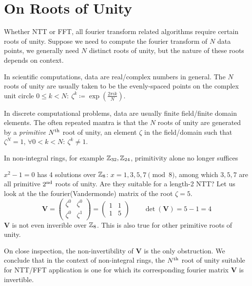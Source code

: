 \section{On Roots of Unity} \label{section:roots}
Whether NTT or FFT, all fourier transform related algorithms require certain roots of unity. Suppose we need to compute the fourier transform of \(N\) data points, we generally need \(N\) distinct roots of unity, but the nature of these roots depends on context.

In scientific computations, data are real/complex numbers in general. The \(N\) roots of unity are usually taken to be the evenly-spaced points on the complex unit circle \(0 \le k < N:\: \zeta^k \coloneq \exp{(\frac{2 \pi i k}{N})}\).

In discrete computational problems, data are usually finite field/finite domain elements. The often repeated mantra is that the \(N\) roots of unity are generated by a \emph{primitive} \(N\textsuperscript{th}\) root of unity, an element \(\zeta\) in the field/domain such that \(\zeta^N = 1\), \(\forall 0 < k < N:\: \zeta^k \neq 1\).

In non-integral rings, for example \(\mathbb{Z}_{32}, \mathbb{Z}_{24}\), primitivity alone no longer suffices
\begin{example}
    \(x^2 - 1 = 0\) has 4 solutions over \(\mathbb{Z}_8\): \(x = 1, 3, 5, 7 \pmod{8}\), among which \(3, 5, 7\) are all primitive \(2\textsuperscript{nd}\) roots of unity. Are they suitable for a length-2 NTT? Let us look at the the fourier(Vandermonde) matrix of the root \(\zeta = 5\).
    \[\bm{V} = \begin{pmatrix}
        \zeta^{0} & \zeta^{0} \\
        \zeta^{0} & \zeta^{1}
    \end{pmatrix} = \begin{pmatrix}
        1 & 1 \\
        1 & 5
    \end{pmatrix} \qquad \det{(\bm{V})} = 5 - 1 = 4\]
    \(\bm{V}\) is not even inverible over \(\mathbb{Z}_8\). This is also true for other primitive roots of unity.
\end{example}

On close inspection, the non-invertibility of \(\bm{V}\) is the only obstruction. We conclude that in the context of non-integral rings, the \(N\textsuperscript{th}\) root of unity suitable for NTT/FFT application is one for which its corresponding fourier matrix \(\bm{V}\) is invertible.

